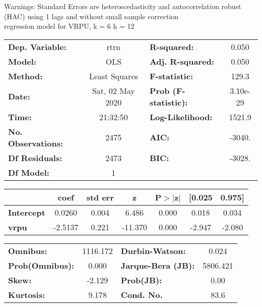 Warnings: \newline
 [1] Standard Errors are heteroscedasticity and autocorrelation robust (HAC) using 1 lags and without small sample correction\\ 

regression model for VRPU, k = 6 h = 12\begin{center}
\begin{tabular}{lclc}
\toprule
\textbf{Dep. Variable:}    &       rtrn       & \textbf{  R-squared:         } &     0.050   \\
\textbf{Model:}            &       OLS        & \textbf{  Adj. R-squared:    } &     0.050   \\
\textbf{Method:}           &  Least Squares   & \textbf{  F-statistic:       } &     129.3   \\
\textbf{Date:}             & Sat, 02 May 2020 & \textbf{  Prob (F-statistic):} &  3.10e-29   \\
\textbf{Time:}             &     21:32:50     & \textbf{  Log-Likelihood:    } &    1521.9   \\
\textbf{No. Observations:} &        2475      & \textbf{  AIC:               } &    -3040.   \\
\textbf{Df Residuals:}     &        2473      & \textbf{  BIC:               } &    -3028.   \\
\textbf{Df Model:}         &           1      & \textbf{                     } &             \\
\bottomrule
\end{tabular}
\begin{tabular}{lcccccc}
                   & \textbf{coef} & \textbf{std err} & \textbf{z} & \textbf{P$> |$z$|$} & \textbf{[0.025} & \textbf{0.975]}  \\
\midrule
\textbf{Intercept} &       0.0260  &        0.004     &     6.486  &         0.000        &        0.018    &        0.034     \\
\textbf{vrpu}      &      -2.5137  &        0.221     &   -11.370  &         0.000        &       -2.947    &       -2.080     \\
\bottomrule
\end{tabular}
\begin{tabular}{lclc}
\textbf{Omnibus:}       & 1116.172 & \textbf{  Durbin-Watson:     } &    0.024  \\
\textbf{Prob(Omnibus):} &   0.000  & \textbf{  Jarque-Bera (JB):  } & 5806.421  \\
\textbf{Skew:}          &  -2.129  & \textbf{  Prob(JB):          } &     0.00  \\
\textbf{Kurtosis:}      &   9.178  & \textbf{  Cond. No.          } &     83.6  \\
\bottomrule
\end{tabular}
\end{center}

